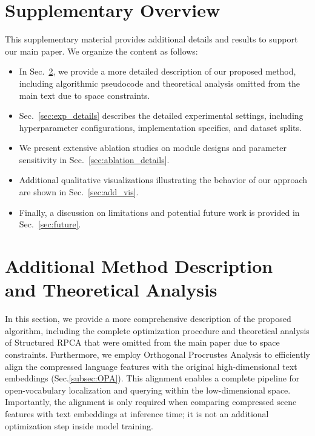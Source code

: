 \section{Supplementary Overview}
\label{sec:supp-overview}
This supplementary material provides additional details and results to support our main paper. 
We organize the content as follows:
\begin{itemize}
    \item In Sec.~\ref{sec:method_details}, we provide a more detailed description of our proposed method, including algorithmic pseudocode and theoretical analysis omitted from the main text due to space constraints.
    \item Sec.~\ref{sec:exp_details} describes the detailed experimental settings, including hyperparameter configurations, implementation specifics, and dataset splits.
    \item We present extensive ablation studies on module designs and parameter sensitivity in Sec.~\ref{sec:ablation_details}.
    \item Additional qualitative visualizations illustrating the behavior of our approach are shown in Sec.~\ref{sec:add_vis}.
    \item Finally, a discussion on limitations and potential future work is provided in Sec.~\ref{sec:future}.
\end{itemize}

\section{Additional Method Description and Theoretical Analysis}
\label{sec:method_details}
In this section, we provide a more comprehensive description of the proposed algorithm, including the complete optimization procedure and theoretical analysis of Structured RPCA that were omitted from the main paper due to space constraints. 
Furthermore, we employ Orthogonal Procrustes Analysis to efficiently align the compressed language features with the original high-dimensional text embeddings (Sec.\ref{subsec:OPA}). This alignment enables a complete pipeline for open-vocabulary localization and querying within the low-dimensional space. Importantly, the alignment is only required when comparing compressed scene features with text embeddings at inference time; it is not an additional optimization step inside model training.

